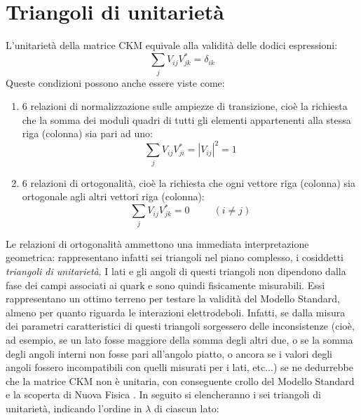 \section{Triangoli di unitarietà}
\noindent
L'unitarietà della matrice CKM equivale alla validità delle dodici espressioni:
\begin{equation}
  \sum_j V_{ij}V_{jk}^* = \delta_{ik}
\end{equation}
Queste condizioni possono anche essere viste come:
\begin{enumerate}
 \item $6$ relazioni di normalizzazione sulle ampiezze di transizione, cioè la richiesta che la somma dei moduli quadri di tutti gli elementi appartenenti alla stessa riga (colonna) sia pari ad uno:
    \begin{equation}
     \sum_j V_{ij}V_{ji}^* = |V_{ij}|^2 = 1
    \end{equation}
 \item $6$ relazioni di ortogonalità, cioè la richiesta che ogni vettore riga (colonna) sia ortogonale agli altri vettori riga (colonna):
    \begin{equation}
     \sum_j V_{ij}V_{jk}^* = 0 \ \ \ \ \ \ \ \ \ \ \ (i\neq j)
    \end{equation}

\end{enumerate}
Le relazioni di ortogonalità ammettono una immediata interpretazione geometrica: rappresentano infatti sei triangoli nel piano complesso, i cosiddetti \emph{triangoli di unitarietà}.
I lati e gli angoli di questi triangoli non dipendono dalla fase dei campi associati ai quark e sono quindi fisicamente misurabili. Essi rappresentano un ottimo terreno
per testare la validità del Modello Standard, almeno per quanto riguarda le interazioni elettrodeboli. Infatti, se dalla misura dei parametri caratteristici di questi triangoli
sorgessero delle inconsistenze (cioè, ad esempio, se un lato fosse maggiore della somma degli altri due, o se la somma degli angoli interni non fosse pari all'angolo piatto, 
o ancora se i valori degli angoli fossero incompatibili con quelli misurati per i lati, etc...) se ne dedurrebbe che la matrice CKM non è unitaria, con conseguente
crollo del Modello Standard e la scoperta di Nuova Fisica \cite{BigiSanda}.
In seguito si elencheranno i sei triangoli di unitarietà, indicando l'ordine in $\lambda$ di ciascun lato:
